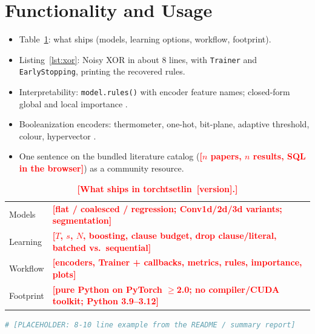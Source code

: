 \documentclass[twoside,11pt]{article}
\newcommand{\ph}[1]{\textcolor{red}{\textbf{[#1]}}}
\newenvironment{plan}{\begin{itemize}\color{gray}\small}{\end{itemize}}
\newcommand{\budget}[1]{\marginpar{\tiny\color{blue}#1}}
\newcommand{\code}[1]{\texttt{#1}}
\newcommand{\lib}{\textsf{torchtsetlin}}
\begin{document}
\section{Functionality and Usage}
\label{sec:usage}
\budget{$\approx$0.7 p}
\begin{plan}
  \item Table~\ref{tab:features}: what ships (models, learning options, workflow, footprint).
  \item Listing~\ref{lst:xor}: Noisy XOR in about 8 lines, with \code{Trainer} and \code{EarlyStopping}, printing the recovered rules.
  \item Interpretability: \code{model.rules()} with encoder feature names; closed-form global and local importance \citep{blakely2020closedform}.
  \item Booleanization encoders: thermometer, one-hot, bit-plane, adaptive threshold, colour, hypervector \citep{halenka2024hypervectors}.
  \item One sentence on the bundled literature catalog (\ph{$n$ papers, $n$ results, SQL in the browser}) as a community resource.
\end{plan}

\begin{table}[t]
  \centering\small
  \caption{\ph{What ships in \lib\ \ph{version}.}}
  \label{tab:features}
  \begin{tabular}{@{}ll@{}}
    \toprule
    Models    & \ph{flat / coalesced / regression; Conv1d/2d/3d variants; segmentation} \\
    Learning  & \ph{$T$, $s$, $N$, boosting, clause budget, drop clause/literal, batched vs.\ sequential} \\
    Workflow  & \ph{encoders, Trainer + callbacks, metrics, rules, importance, plots} \\
    Footprint & \ph{pure Python on PyTorch $\ge$2.0; no compiler/CUDA toolkit; Python 3.9--3.12} \\
    \bottomrule
  \end{tabular}
\end{table}

\begin{lstlisting}[language=Python, basicstyle=\ttfamily\footnotesize, caption={\ph{Noisy XOR example}}, label={lst:xor}]
# [PLACEHOLDER: 8-10 line example from the README / summary report]
\end{lstlisting}

\end{document}
